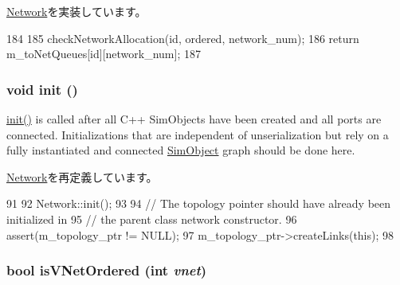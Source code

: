 \hyperlink{classNetwork_aeb27c17e088f115f8b5e3366c9ef8415}{Network}を実装しています。


\begin{DoxyCode}
184 {
185     checkNetworkAllocation(id, ordered, network_num);
186     return m_toNetQueues[id][network_num];
187 }
\end{DoxyCode}
\hypertarget{classSimpleNetwork_a02fd73d861ef2e4aabb38c0c9ff82947}{
\subsubsection[{init}]{\setlength{\rightskip}{0pt plus 5cm}void init ()}}
\label{classSimpleNetwork_a02fd73d861ef2e4aabb38c0c9ff82947}
\hyperlink{classSimpleNetwork_a02fd73d861ef2e4aabb38c0c9ff82947}{init()} is called after all C++ SimObjects have been created and all ports are connected. Initializations that are independent of unserialization but rely on a fully instantiated and connected \hyperlink{classSimObject}{SimObject} graph should be done here. 

\hyperlink{classNetwork_a02fd73d861ef2e4aabb38c0c9ff82947}{Network}を再定義しています。


\begin{DoxyCode}
91 {
92     Network::init();
93 
94     // The topology pointer should have already been initialized in
95     // the parent class network constructor.
96     assert(m_topology_ptr != NULL);
97     m_topology_ptr->createLinks(this);
98 }
\end{DoxyCode}
\hypertarget{classSimpleNetwork_a52d31485b47857b8e7eb4a89efdf56a6}{
\subsubsection[{isVNetOrdered}]{\setlength{\rightskip}{0pt plus 5cm}bool isVNetOrdered (int {\em vnet})}}
\label{classSimpleNetwork_a52d31485b47857b8e7eb4a89efdf56a6}



